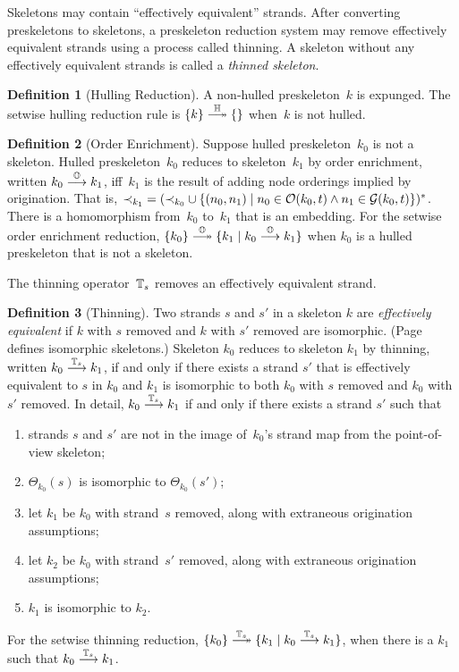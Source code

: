 \documentclass[12pt]{report}
\theoremstyle{definition}
\newtheorem{defn}{Definition}[chapter]
\begin{document}
Skeletons may contain ``effectively equivalent'' strands.  After
converting preskeletons to skeletons, a preskeleton reduction system
may remove effectively equivalent strands using a process called
thinning.  A skeleton without any effectively
equivalent strands is called a \emph{thinned skeleton}.

\begin{defn}[Hulling Reduction]\label{def:hulling}
A non-hulled preskeleton~$k$ is expunged.  The setwise hulling
reduction rule is $\{k\}\setreduction{\ops{H}}\{\}$ when~$k$ is not
hulled.
\end{defn}

\begin{defn}[Order Enrichment]
Suppose hulled preskeleton~$k_0$ is not a skeleton.  Hulled
preskeleton~$k_0$ reduces to skeleton~$k_1$ by order enrichment, written
$k_0\stackrel{\mathbb O}{\longrightarrow}k_1$, iff~$k_1$ is the result of adding node
orderings implied by origination.  That is,
$\mathbin{\prec_{k_1}}= (\mathbin{\prec_{k_0}}\cup\{(n_0,n_1)\mid n_0\in\mathcal{O}(k_0,t)\land
n_1\in\mathcal{G}(k_0,t)\})^\ast$.
There is a homomorphism from~$k_0$ to~$k_1$ that is an embedding.  For
the setwise order enrichment reduction,
$\{k_0\}\setreduction{\ops{O}}\{k_1\mid k_0\reduction{\ops{O}}k_1\}$
when $k_0$ is a hulled preskeleton that is not a skeleton.
\end{defn}

The thinning operator~$\mathbb T_s$ removes an effectively equivalent strand.

\begin{defn}[Thinning]\label{def:thinning}
Two strands $s$ and $s'$ in a skeleton $k$ are \emph{effectively
  equivalent} if $k$ with $s$ removed and $k$ with $s'$ removed are
isomorphic.  (Page~\pageref{def:isomorphic preskeletons} defines
isomorphic skeletons.)  Skeleton $k_0$ reduces to skeleton $k_1$ by
thinning, written $k_0\stackrel{\mathbb T_s}{\longrightarrow}k_1$, if and only if there
exists a strand $s'$ that is effectively equivalent to $s$ in $k_0$
and $k_1$ is isomorphic to both $k_0$ with $s$ removed and $k_0$ with
$s'$ removed.  In detail, $k_0\stackrel{\mathbb T_s}{\longrightarrow}k_1$ if and only if
there exists a strand $s'$ such that
\begin{enumerate}
\item strands $s$ and $s'$ are not in the image of~$k_0$'s
  strand map from the point-of-view skeleton;
\item $\Theta_{k_0}(s)$ is isomorphic to $\Theta_{k_0}(s')$;
\item let $k_1$ be $k_0$ with strand~$s$ removed, along with
  extraneous origination assumptions;
\item let $k_2$ be $k_0$ with strand~$s'$ removed, along with
  extraneous origination assumptions;
\item $k_1$ is isomorphic to $k_2$.
\end{enumerate}

For the setwise thinning reduction,
$\{k_0\}\setreduction{\ops{T}_s}\{k_1\mid
k_0\reduction{\ops{T}_s}k_1\}$, when there is a $k_1$ such that
$k_0\stackrel{\mathbb T_s}{\longrightarrow}k_1$.
\end{defn}
\end{document}
